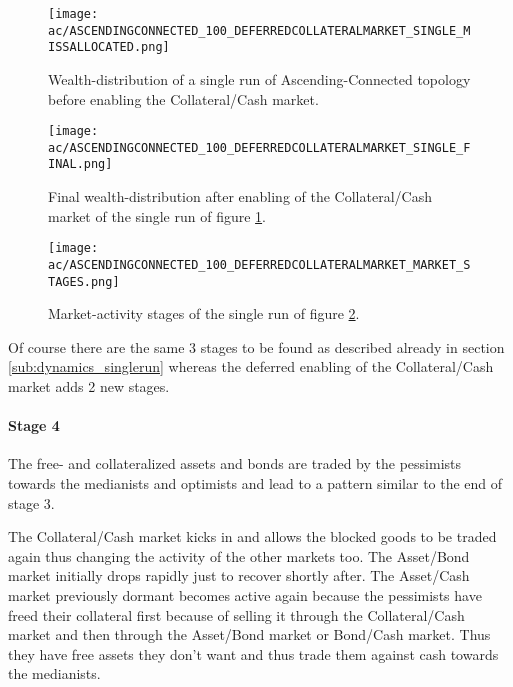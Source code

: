 \documentclass[Bachelorarbeit.tex]{subfiles}
\begin{document}
\medskip

\begin{figure}[H]
	\centering
  \texttt{[image: ac/ASCENDINGCONNECTED\_100\_DEFERREDCOLLATERALMARKET\_SINGLE\_MISSALLOCATED.png]}
  	\caption{Wealth-distribution of a single run of Ascending-Connected topology before enabling the Collateral/Cash market.}
	\label{fig:wealth_ASCENDINGCONNECTED_100_DEFERREDCOLLATERALMARKET_SINGLE_MISSALLOCATED}
\end{figure}

\begin{figure}[H]
	\centering
  \texttt{[image: ac/ASCENDINGCONNECTED\_100\_DEFERREDCOLLATERALMARKET\_SINGLE\_FINAL.png]}
  	\caption{Final wealth-distribution after enabling of the Collateral/Cash market of the single run of figure \ref{fig:wealth_ASCENDINGCONNECTED_100_DEFERREDCOLLATERALMARKET_SINGLE_MISSALLOCATED}.}
	\label{fig:wealth_ASCENDINGCONNECTED_100_DEFERREDCOLLATERALMARKET_SINGLE_FINAL}
\end{figure}

\begin{figure}[H]
	\centering
  \texttt{[image: ac/ASCENDINGCONNECTED\_100\_DEFERREDCOLLATERALMARKET\_MARKET\_STAGES.png]}
  	\caption{Market-activity stages of the single run of figure \ref{fig:wealth_ASCENDINGCONNECTED_100_DEFERREDCOLLATERALMARKET_SINGLE_FINAL}.}
	\label{fig:markets_ASCENDINGCONNECTED_100_DEFERREDCOLLATERALMARKET_MARKET_STAGES}
\end{figure}

Of course there are the same 3 stages to be found as described already in section \ref{sub:dynamics_singlerun} whereas the deferred enabling of the Collateral/Cash market adds 2 new stages.

\paragraph{Stage 4}
The free- and collateralized assets and bonds are traded by the pessimists towards the medianists and optimists and lead to a pattern similar to the end of stage 3.

\medskip

The Collateral/Cash market kicks in and allows the blocked goods to be traded again thus changing the activity of the other markets too. The Asset/Bond market initially drops rapidly just to recover shortly after. The Asset/Cash market previously dormant becomes active again because the pessimists have freed their collateral first because of selling it through the Collateral/Cash market and then through the Asset/Bond market or Bond/Cash market. Thus they have free assets they don't want and thus trade them against cash towards the medianists.
\end{document}
